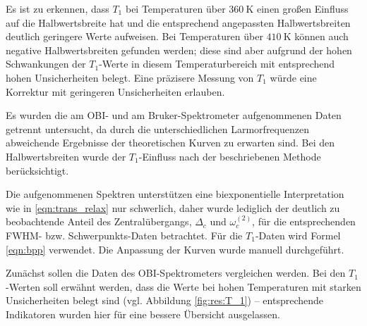 Es ist zu erkennen, dass $T_1$ bei Temperaturen über $\SI{360}{\kelvin}$ einen großen Einfluss auf die Halbwertsbreite hat und die entsprechend angepassten Halbwertsbreiten deutlich geringere Werte aufweisen. Bei Temperaturen über $\SI{410}{\kelvin}$ können auch negative Halbwertsbreiten gefunden werden; diese sind aber aufgrund der hohen Schwankungen der $T_1$-Werte in diesem Temperaturbereich mit entsprechend hohen Unsicherheiten belegt. Eine präzisere Messung von $T_1$ würde eine Korrektur mit geringeren Unsicherheiten erlauben.




Es wurden die am OBI- und am Bruker-Spektrometer aufgenommenen Daten getrennt untersucht, da durch die unterschiedlichen Larmorfrequenzen abweichende Ergebnisse der theoretischen Kurven zu erwarten sind. Bei den Halbwertsbreiten wurde der $T_1$-Einfluss nach der beschriebenen Methode berücksichtigt.



Die aufgenommenen Spektren unterstützen eine biexponentielle Interpretation wie in \eqref{eqn:trans_relax} nur schwerlich, daher wurde lediglich der deutlich zu beobachtende Anteil des Zentralübergangs, $\Delta_c$ und $\omega_c^{(2)}$, für die entsprechenden FWHM- bzw. Schwer\-punkts-Da\-ten betrachtet. Für die $T_1$-Daten wird Formel \eqref{eqn:bpp} verwendet. Die Anpassung der Kurven wurde manuell durchgeführt.



Zunächst sollen die Daten des OBI-Spektrometers vergleichen werden. Bei den $T_1$-Werten soll erwähnt werden, dass die Werte bei hohen Temperaturen mit starken Unsicherheiten belegt sind (vgl. Abbildung \ref{fig:res:T_1}) -- entsprechende Indikatoren wurden hier für eine bessere Übersicht ausgelassen.

